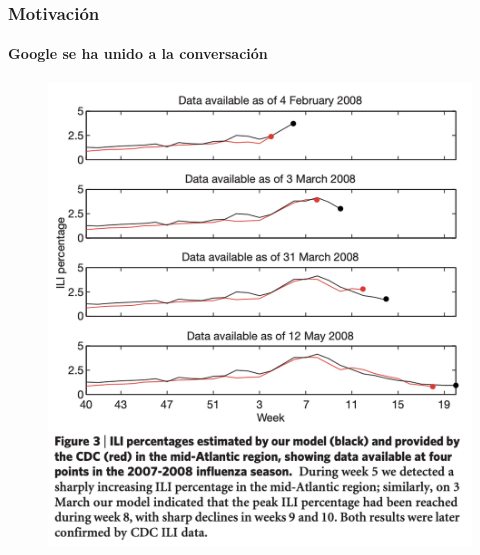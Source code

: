 \documentclass[
  shownotes,
  xcolor={svgnames},
  hyperref={colorlinks,citecolor=DarkBlue,linkcolor=DarkRed,urlcolor=DarkBlue}
  , aspectratio=169]{beamer}
\begin{document}
\begin{frame}
\frametitle{Motivación}
\framesubtitle{Google se ha unido a la conversación}
\begin{figure}[H] \centering
            \captionsetup{justification=centering}  
            \includegraphics[scale=0.45]{figures/flu_trends}
    \end{figure}
\end{frame}


\end{document}

